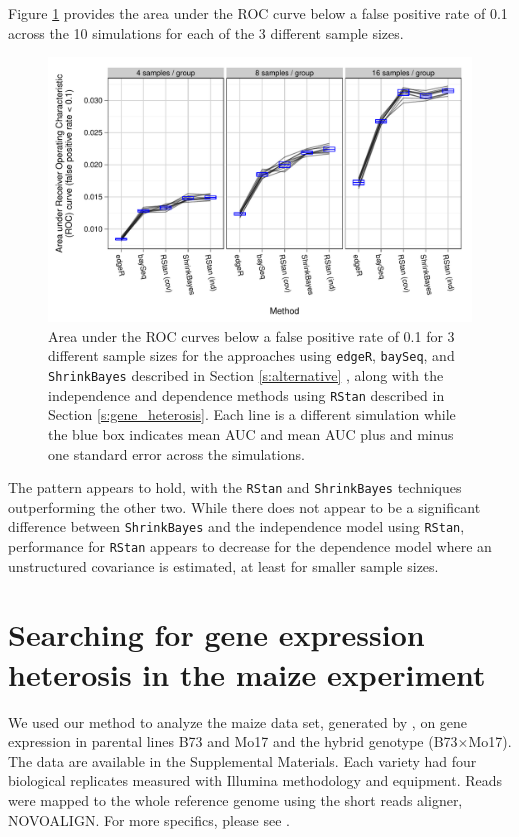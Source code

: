 \documentclass[useAMS,usenatbib,referee]{biom}
\begin{document}
Figure \ref{f:auc} provides the area under the ROC curve below a false positive rate of 0.1 across the 10 simulations for each of the 3 different sample sizes. 
\begin{figure}
\centerline{\includegraphics[width=\textwidth]{auc-facet-TRUE}}
\caption{Area under the ROC curves below a false positive rate of 0.1 for 3 different sample sizes for the approaches using {\tt edgeR}, {\tt baySeq},  and {\tt ShrinkBayes} described in Section \ref{s:alternative} , along with the independence and dependence methods using {\tt RStan} described in Section \ref{s:gene_heterosis}. Each line is a different simulation while the blue box indicates mean AUC and mean AUC plus and minus one standard error across the simulations.}
\label{f:auc}
\end{figure}
The pattern appears to hold, with the {\tt RStan} and {\tt ShrinkBayes} techniques outperforming the other two. While there does not appear to be a significant difference between {\tt ShrinkBayes} and the independence model using {\tt RStan}, performance for {\tt RStan} appears to decrease for the dependence model where an unstructured covariance is estimated, at least for smaller sample sizes.



\section{Searching for gene expression heterosis in the maize experiment}
\label{s:maize}

We used our method to analyze the maize data set, generated by \cite{paschold2012complementation}, on gene expression in parental lines B73 and Mo17 and the hybrid genotype (B73$\times$Mo17). The data are available in the Supplemental Materials. Each variety had four biological replicates measured with Illumina methodology and equipment. Reads were mapped to the whole reference genome using the short reads aligner, NOVOALIGN. For more specifics, please see \cite{paschold2012complementation}. 
\end{document}
